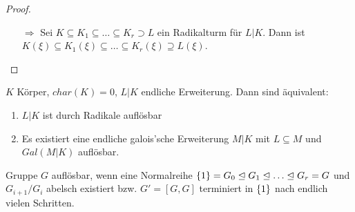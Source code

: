 \documentclass[../main.tex]{subfiles}
\begin{document}
\begin{proof}
\begin{enumerate}[label=\alph*)]
\begin{itemize}
            \item[$\Rightarrow$]
            Sei $K\subseteq K_1\subseteq \dots\subseteq K_r\supset L$ ein Radikalturm für $L|K$.
            Dann ist $K(\xi)\subseteq K_1(\xi)\subseteq\dots\subseteq K_r(\xi)\supseteq L(\xi)$.
        \end{itemize}
    \end{enumerate}
\end{proof}

\begin{theorem}\label{theo:3.25}
    $K$ Körper, $char(K)=0$, $L|K$ endliche Erweiterung. Dann sind äquivalent:
    \begin{enumerate}[label=(\roman*)]
        \item $L|K$ ist durch Radikale auflösbar
        \item Es existiert eine endliche galois'sche Erweiterung $M|K$ mit $L\subseteq M$ und $Gal(M|K)$ auflösbar.
    \end{enumerate}
\end{theorem}
\begin{reminder*}
    Gruppe $G$ auflösbar, wenn eine Normalreihe $\trivGO=G_0\nteq G_1 \nteq\dots\nteq G_r = G$ und $G_{i+1}/G_i$ abelsch existiert bzw. $G' = [G,G]$ terminiert in $\{1\}$ nach endlich vielen Schritten.
\end{reminder*}
\end{document}
